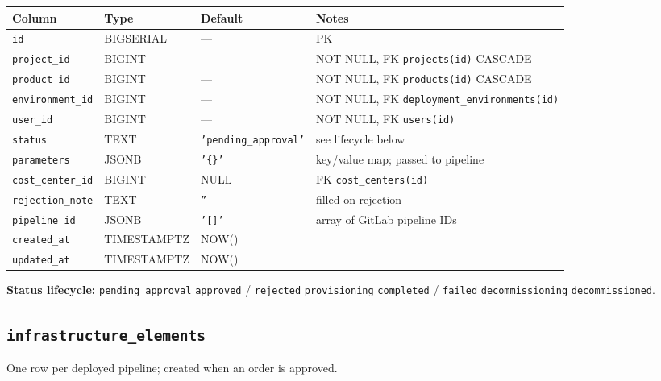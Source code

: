 \documentclass[12pt,a4paper,twoside]{report}
\newcommand{\code}[1]{\texttt{#1}}
\begin{document}
\begin{table}[H]
  \centering\small
  \begin{tabular}{@{}llll@{}}
    \toprule
    \textbf{Column} & \textbf{Type} & \textbf{Default} & \textbf{Notes} \\
    \midrule
    \code{id}             & BIGSERIAL   & ---     & PK \\
    \code{project\_id}    & BIGINT      & ---     & NOT NULL, FK \textrightarrow{} \code{projects(id)} CASCADE \\
    \code{product\_id}    & BIGINT      & ---     & NOT NULL, FK \textrightarrow{} \code{products(id)} CASCADE \\
    \code{environment\_id}& BIGINT      & ---     & NOT NULL, FK \textrightarrow{} \code{deployment\_environments(id)} \\
    \code{user\_id}       & BIGINT      & ---     & NOT NULL, FK \textrightarrow{} \code{users(id)} \\
    \code{status}         & TEXT        & \code{'pending\_approval'} & see lifecycle below \\
    \code{parameters}     & JSONB       & \code{'\{\}'} & key/value map; passed to pipeline \\
    \code{cost\_center\_id}& BIGINT     & NULL    & FK \textrightarrow{} \code{cost\_centers(id)} \\
    \code{rejection\_note}& TEXT        & \code{''} & filled on rejection \\
    \code{pipeline\_id}   & JSONB       & \code{'[]'} & array of GitLab pipeline IDs \\
    \code{created\_at}    & TIMESTAMPTZ & NOW()   & \\
    \code{updated\_at}    & TIMESTAMPTZ & NOW()   & \\
    \bottomrule
  \end{tabular}
\end{table}

\noindent\textbf{Status lifecycle:}
\code{pending\_approval} \textrightarrow{} \code{approved} / \code{rejected}
\textrightarrow{} \code{provisioning} \textrightarrow{} \code{completed} / \code{failed}
\textrightarrow{} \code{decommissioning} \textrightarrow{} \code{decommissioned}.

\subsection*{\texttt{infrastructure\_elements}}

One row per deployed pipeline; created when an order is approved.
\end{document}
